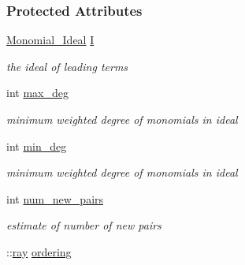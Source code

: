\subsubsection*{Protected Attributes}
\begin{DoxyCompactItemize}
\item 
\mbox{\label{group___g_b_computation_a8420b03d8ff30fd0f59f9059a1c2ebf2}} 
\hyperlink{group__polygroup_class_monomial___ideal}{Monomial\+\_\+\+Ideal} \hyperlink{group___g_b_computation_a8420b03d8ff30fd0f59f9059a1c2ebf2}{I}
\begin{DoxyCompactList}\small\item\em the ideal of leading terms \end{DoxyCompactList}\item 
\mbox{\label{group___g_b_computation_a8271676ce9422ea311a93aac66e8470d}} 
int \hyperlink{group___g_b_computation_a8271676ce9422ea311a93aac66e8470d}{max\+\_\+deg}
\begin{DoxyCompactList}\small\item\em minimum weighted degree of monomials in ideal \end{DoxyCompactList}\item 
\mbox{\label{group___g_b_computation_a698239aea883e7b53c9e670a91f0c30d}} 
int \hyperlink{group___g_b_computation_a698239aea883e7b53c9e670a91f0c30d}{min\+\_\+deg}
\begin{DoxyCompactList}\small\item\em minimum weighted degree of monomials in ideal \end{DoxyCompactList}\item 
\mbox{\label{group___g_b_computation_a25bad843201118123213603384f208ba}} 
int \hyperlink{group___g_b_computation_a25bad843201118123213603384f208ba}{num\+\_\+new\+\_\+pairs}
\begin{DoxyCompactList}\small\item\em estimate of number of new pairs \end{DoxyCompactList}\item 
\mbox{\label{group___g_b_computation_a58f415a5c63a67ca1dfcec9bf060eec4}} 
\+::\hyperlink{group___c_l_s_solvers_classray}{ray} \hyperlink{group___g_b_computation_a58f415a5c63a67ca1dfcec9bf060eec4}{ordering}

\end{DoxyCompactItemize}

